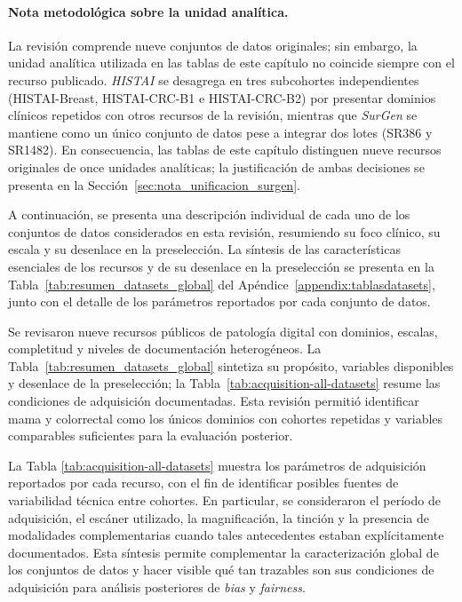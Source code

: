 \paragraph{Nota metodológica sobre la unidad analítica.} La revisión comprende nueve conjuntos de datos originales; sin embargo, la unidad analítica utilizada en las tablas de este capítulo no coincide siempre con el recurso publicado. \textit{HISTAI} se desagrega en tres subcohortes independientes (HISTAI-Breast, HISTAI-CRC-B1 e HISTAI-CRC-B2) por presentar dominios clínicos repetidos con otros recursos de la revisión, mientras que \textit{SurGen} se mantiene como un único conjunto de datos pese a integrar dos lotes (SR386 y SR1482). En consecuencia, las tablas de este capítulo distinguen nueve recursos originales de once unidades analíticas; la justificación de ambas decisiones se presenta en la Sección~\ref{sec:nota_unificacion_surgen}.

A continuación, se presenta una descripción individual de cada uno de los conjuntos de datos considerados en esta revisión, resumiendo su foco clínico, su escala y su desenlace en la preselección. La síntesis de las características esenciales de los recursos y de su desenlace en la preselección se presenta en la Tabla~\ref{tab:resumen_datasets_global} del Apéndice~\ref{appendix:tablasdatasets}, junto con el detalle de los parámetros reportados por cada conjunto de datos.

Se revisaron nueve recursos públicos de patología digital con dominios, escalas, completitud y niveles de documentación heterogéneos. La Tabla~\ref{tab:resumen_datasets_global} sintetiza su propósito, variables disponibles y desenlace de la preselección; la Tabla~\ref{tab:acquisition-all-datasets} resume las condiciones de adquisición documentadas. Esta revisión permitió identificar mama y colorrectal como los únicos dominios con cohortes repetidas y variables comparables suficientes para la evaluación posterior.

La Tabla \ref{tab:acquisition-all-datasets} muestra los parámetros de adquisición reportados por cada recurso, con el fin de identificar posibles fuentes de variabilidad técnica entre cohortes. En particular, se consideraron el período de adquisición, el escáner utilizado, la magnificación, la tinción y la presencia de modalidades complementarias cuando tales antecedentes estaban explícitamente documentados. Esta síntesis permite complementar la caracterización global de los conjuntos de datos y hacer visible qué tan trazables son sus condiciones de adquisición para análisis posteriores de \textit{bias} y \textit{fairness}.

